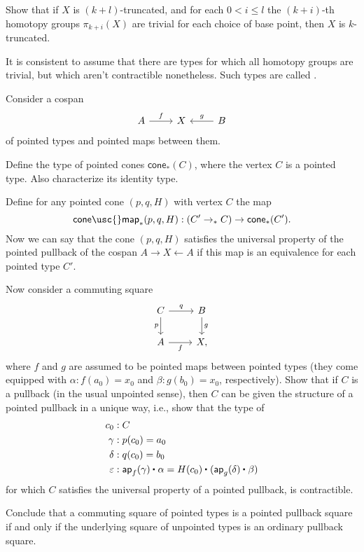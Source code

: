 \begin{exercises}
\begin{subexenum}
\item Show that if $X$ is $(k+l)$-truncated, and for each $0< i\leq l$ the $(k+i)$-th homotopy groups $\pi_{k+i}(X)$ are trivial for each choice of base point, then $X$ is $k$-truncated.
\end{subexenum}
It is consistent to assume that there are types for which all homotopy groups are trivial, but which aren't contractible nonetheless. Such types are called .
\item
  Consider a cospan
  \begin{equation*}
    \begin{tikzcd}
      A \arrow[r,"f"] & X & B \arrow[l,swap,"g"]
    \end{tikzcd}
  \end{equation*}
  of pointed types and pointed maps between them.
  \begin{subexenum}
  \item Define the type of pointed cones $\mathsf{cone}_\ast(C)$, where the vertex $C$ is a pointed type. Also characterize its identity type.
  \item Define for any pointed cone $(p,q,H)$ with vertex $C$ the map
    \begin{equation*}
      \mathsf{cone\usc{}map}_\ast(p,q,H) : (C' \to_\ast C) \to \mathsf{cone}_\ast(C').
    \end{equation*}
    Now we can say that the cone $(p,q,H)$ satisfies the universal property of the pointed pullback of the cospan $A\rightarrow X \leftarrow A$ if this map is an equivalence for each pointed type $C'$.
  \item Now consider a commuting square
    \begin{equation*}
      \begin{tikzcd}
        C \arrow[r,"q"] \arrow[d,swap,"p"] & B \arrow[d,"g"] \\
        A \arrow[r,swap,"f"] & X,
      \end{tikzcd}
    \end{equation*}
    where $f$ and $g$ are assumed to be pointed maps between pointed types (they come equipped with $\alpha : f(a_0)=x_0$ and $\beta : g(b_0)=x_0$, respectively). Show that if $C$ is a pullback (in the usual unpointed sense), then $C$ can be given the structure of a pointed pullback in a unique way, i.e., show that the type of
    \begin{align*}
      c_0 & : C \\
      \gamma & : p(c_0)=a_0 \\
      \delta & : q(c_0)=b_0 \\
      \varepsilon & : \ct{\ap{f}{\gamma}}{\alpha}=\ct{H(c_0)}{(\ct{\ap{g}{\delta}}{\beta})}
    \end{align*}
    for which $C$ satisfies the universal property of a pointed pullback, is contractible.
  \item Conclude that a commuting square of pointed types is a pointed pullback square if and only if the underlying square of unpointed types is an ordinary pullback square.
  \end{subexenum}
\end{exercises}
